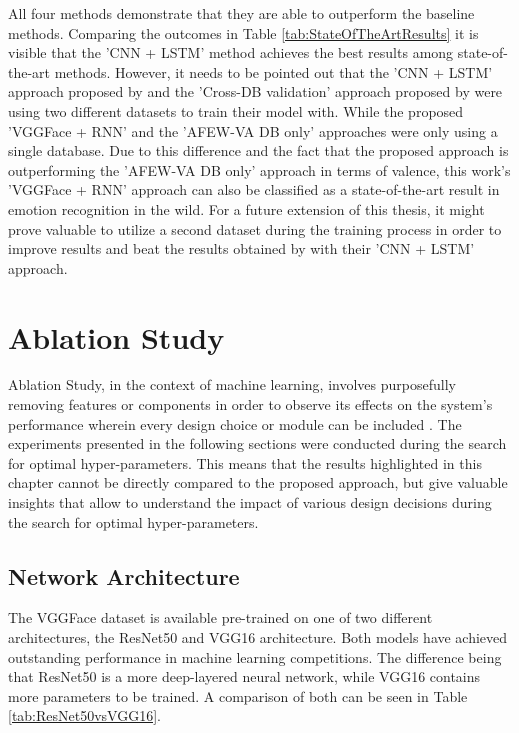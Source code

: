 \noindent All four methods demonstrate that they are able to outperform the baseline methods. Comparing the outcomes in Table \ref{tab:StateOfTheArtResults} it is visible that the 'CNN + LSTM' method achieves the best results among state-of-the-art methods. 
\newline\newline
However, it needs to be pointed out that the 'CNN + LSTM' approach proposed by \citet{Theagarajan:2018:DeepDriver} and the 'Cross-DB validation' approach proposed by \citet{Handrich:2020:SimultaneousPredVA} were using two different datasets to train their model with. While the proposed 'VGGFace + RNN' and the 'AFEW-VA DB only' approaches were only using a single database. Due to this difference and the fact that the proposed approach is outperforming the 'AFEW-VA DB only' approach in terms of valence, this work's 'VGGFace + RNN' approach can also be classified as a state-of-the-art result in emotion recognition in the wild.
\newline\newline
For a future extension of this thesis, it might prove valuable to utilize a second dataset during the training process in order to improve results and beat the results obtained by \citet{Theagarajan:2018:DeepDriver} with their 'CNN + LSTM' approach.


\section{Ablation Study}
Ablation Study, in the context of machine learning, involves purposefully removing features or components in order to observe its effects on the system's performance wherein every design choice or module can be included \citep{Lillian:2018:AblationOfARobotsBrain}.
\newline\newline
The experiments presented in the following sections were conducted during the search for optimal hyper-parameters. This means that the results highlighted in this chapter cannot be directly compared to the proposed approach, but give valuable insights that allow to understand the impact of various design decisions during the search for optimal hyper-parameters.

\subsection{Network Architecture}
The VGGFace dataset is available pre-trained on one of two different architectures, the ResNet50 and VGG16 architecture. Both models have achieved outstanding performance in machine learning competitions. The difference being that ResNet50 is a more deep-layered neural network, while VGG16 contains more parameters to be trained. A comparison of both can be seen in Table \ref{tab:ResNet50vsVGG16}.

